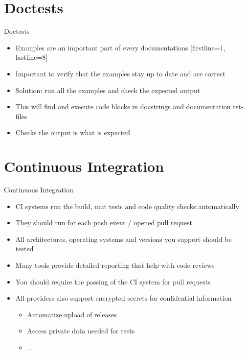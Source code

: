 \section{Doctests}

\begin{frame}[c, fragile]{Doctests}
  \begin{itemize}
    \item Examples are an important part of every documentations
      [firstline=1, lastline=8]
    \item Important to verify that the examples stay up to date and are correct
    \item Solution: run all the examples and check the expected output
    \item This will find and execute code blocks in docstrings and documentation rst-files
    \item Checks the output is what is expected
  \end{itemize}
\end{frame}

\section{Continuous Integration}
\begin{frame}[c]{Continuous Integration}
  \begin{itemize}
    \item CI systems run the build, unit tests and code quality checks automatically
    \item They should run for each push event / opened pull request
    \item All architectures, operating systems and versions you support should be tested
    \item Many tools provide detailed reporting that help with code reviews
    \item You should require the passing of the CI system for pull requests
    \item All providers also support encrypted secrets for confidential information\\
      \begin{itemize}
        \item Automatize upload of releases
        \item Access private data needed for tests
        \item ...
      \end{itemize}
  \end{itemize}
\end{frame}

